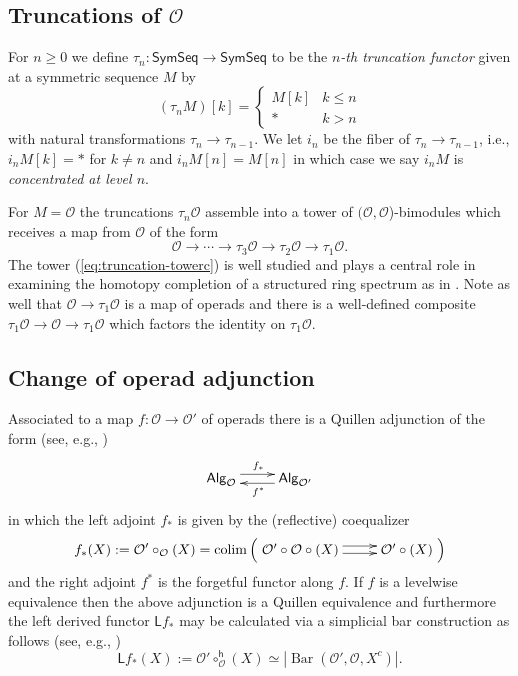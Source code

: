 \documentclass[11pt]{amsart}
\theoremstyle{definition}
\theoremstyle{remark}
\newcommand{\Alg}[1]{ {\mathsf{Alg}_{\mathcal{#1}}} }
\newcommand{\SymSeq}{\mathsf{SymSeq}}
\newcommand{\colim}{\operatorname{colim}}
\newcommand{\Barr}{\operatorname{Bar}}
\newcommand{\pt}{*}
\newcommand{\Cal}[1]{\mathcal{#1}}
\begin{document}
\subsection{Truncations of $\Cal{O}$} \label{sec:trunc}
For $n\geq 0$ we define $\tau_n\colon \SymSeq\to \SymSeq$ to be the \textit{$n$-th truncation functor} given at a symmetric sequence $M$ by \begin{equation*} 
(\tau_n M)[k] = \begin{cases} M[k] & k\leq n \\ \pt & k > n\end{cases} \end{equation*}
with natural transformations $\tau_n\to\tau_{n-1}$. We let $i_n$ be the fiber of $\tau_n\to \tau_{n-1}$, i.e., $i_n M [k] = \pt$ for $k\neq n$ and $i_n M[n]=M[n]$ in which case we say $i_nM$ is \textit{concentrated at level $n$}.

For $M=\Cal{O}$ the truncations $\tau_n \Cal{O}$ assemble into a tower of $(\Cal{O},\Cal{O}$)-bimodules which receives a map from $\Cal{O}$ of the form \begin{equation} \label{eq:truncation-towerc} 
\mathcal{O}\to \cdots \to \tau_3 \Cal{O} \to \tau_2 \Cal{O} \to \tau_1 \Cal{O}.
\end{equation}
The tower (\ref{eq:truncation-towerc}) is well studied and plays a central role in examining the homotopy completion of a structured ring spectrum as in \cite{Har-Hess}. Note as well that $\Cal{O}\to \tau_1\Cal{O}$ is a map of operads and there is a well-defined composite $\tau_1\Cal{O}\to\Cal{O}\to \tau_1\Cal{O}$ which factors the identity on $\tau_1\Cal{O}$.

\subsection{Change of operad adjunction} \label{change-of-Op} Associated to a map $f\colon \Cal{O}\to\Cal{O}'$ of operads there is a Quillen adjunction of the form (see, e.g.,  \cite{Rezk-thesis}) \begin{equation*} 
    \xymatrix{
    \Alg{O} \ar@<.75 ex>[r]^{f_*} &
    \Alg{O'} \ar@<.75 ex>[l]^{f^*}
    }
\end{equation*}
in which the left adjoint $f_*$ is given by the (reflective) coequalizer \[f_*(X):=\Cal{O'} \circ_{\Cal{O}} (X)=\colim \left(\xymatrix{ \Cal{O}'\circ\Cal{O}\circ(X)\ar@<.75ex>[r] \ar@<-.5ex>[r] & \Cal{O}'\circ (X) } \right)\] and the right adjoint $f^*$ is the forgetful functor along $f$. If $f$ is a levelwise equivalence then the above adjunction is a Quillen equivalence and furthermore the left derived functor $\mathsf{L}f_*$ may be calculated via a simplicial bar construction as follows (see, e.g.,  \cite{Har-1})  \begin{equation*}
    \mathsf{L}f_*(X):= \Cal{O}' \circ^{\mathsf{h}}_{\Cal{O}}(X)\simeq |\Barr(\Cal{O}', \Cal{O}, X^c)|.
\end{equation*}
\end{document}
